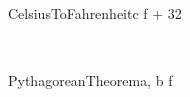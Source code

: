 \documentclass{article}
\begin{document}
	\begin{pseudocode}{CelsiusToFahrenheit}{c}
		f  + 32 \\
	\end{pseudocode}
	\\
	\begin{pseudocode}{PythagoreanTheorem}{a, b}
		f \GETS {} \\
	\end{pseudocode}
\end{document}
